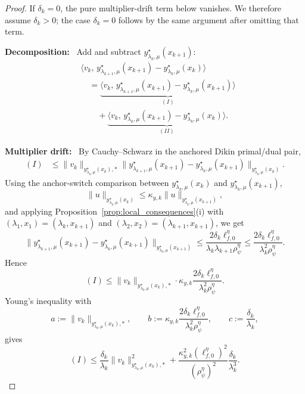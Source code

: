 \documentclass{article}
\newcommand{\proofstep}[1]{\par\smallskip\noindent\textbf{#1}\ }
\begin{document}
\begin{proof}
If \(\delta_k=0\), the pure multiplier-drift term below vanishes. We therefore assume
\(\delta_k>0\); the case \(\delta_k=0\) follows by the same argument after omitting that term.

\proofstep{Decomposition:}
Add and subtract \(y_{\lambda_k,\mu}^\star(x_{k+1})\):
\begin{align}
&\big\langle v_k,\,
y_{\lambda_{k+1},\mu}^\star(x_{k+1})
-y_{\lambda_k,\mu}^\star(x_k)
\big\rangle
\nonumber\\
&\quad=
\underbrace{
\big\langle v_k,\,
y_{\lambda_{k+1},\mu}^\star(x_{k+1})
-y_{\lambda_k,\mu}^\star(x_{k+1})
\big\rangle
}_{(I)}
\nonumber\\
&\qquad+
\underbrace{
\big\langle v_k,\,
y_{\lambda_k,\mu}^\star(x_{k+1})
-y_{\lambda_k,\mu}^\star(x_k)
\big\rangle
}_{(II)} .
\label{eq:proxy_center_split}
\end{align}

\proofstep{Multiplier drift:}
By Cauchy--Schwarz in the anchored Dikin primal/dual pair,
\begin{align}
(I)
&\le
\|v_k\|_{y_{\lambda_k,\mu}^\star(x_k),*}
\big\|
y_{\lambda_{k+1},\mu}^\star(x_{k+1})
-y_{\lambda_k,\mu}^\star(x_{k+1})
\big\|_{y_{\lambda_k,\mu}^\star(x_k)} .
\label{eq:proxy_lambda_drift_cs}
\end{align}
Using the anchor-switch comparison between
\(y_{\lambda_k,\mu}^\star(x_k)\) and \(y_{\lambda_k,\mu}^\star(x_{k+1})\),
\[
\big\|u\big\|_{y_{\lambda_k,\mu}^\star(x_k)}
\le
\kappa_{y,k}\big\|u\big\|_{y_{\lambda_k,\mu}^\star(x_{k+1})},
\]
and applying Proposition~\ref{prop:local_consequences}\textup{(i)} with
\((\lambda_1,x_1)=(\lambda_k,x_{k+1})\) and
\((\lambda_2,x_2)=(\lambda_{k+1},x_{k+1})\), we get
\[
\big\|
y_{\lambda_{k+1},\mu}^\star(x_{k+1})
-y_{\lambda_k,\mu}^\star(x_{k+1})
\big\|_{y_{\lambda_k,\mu}^\star(x_{k+1})}
\le
\frac{2\delta_k\ell_{f,0}^\eta}
{\lambda_k\lambda_{k+1}\rho_\psi^\eta}
\le
\frac{2\delta_k\ell_{f,0}^\eta}
{\lambda_k^2\rho_\psi^\eta}.
\]
Hence
\[
(I)
\le
\|v_k\|_{y_{\lambda_k,\mu}^\star(x_k),*}
\cdot
\kappa_{y,k}
\frac{2\delta_k\ell_{f,0}^\eta}{\lambda_k^2\rho_\psi^\eta}.
\]
Young's inequality with
\[
a:=\|v_k\|_{y_{\lambda_k,\mu}^\star(x_k),*},
\qquad
b:=\kappa_{y,k}\frac{2\delta_k\ell_{f,0}^\eta}{\lambda_k^2\rho_\psi^\eta},
\qquad
c:=\frac{\delta_k}{\lambda_k},
\]
gives
\begin{equation}
\label{eq:proxy_lambda_drift_bound}
(I)
\le
\frac{\delta_k}{\lambda_k}
\|v_k\|_{y_{\lambda_k,\mu}^\star(x_k),*}^2
+
\frac{\kappa_{y,k}^2(\ell_{f,0}^\eta)^2}{(\rho_\psi^\eta)^2}
\frac{\delta_k}{\lambda_k^3}.
\end{equation}


\end{proof}
\end{document}
